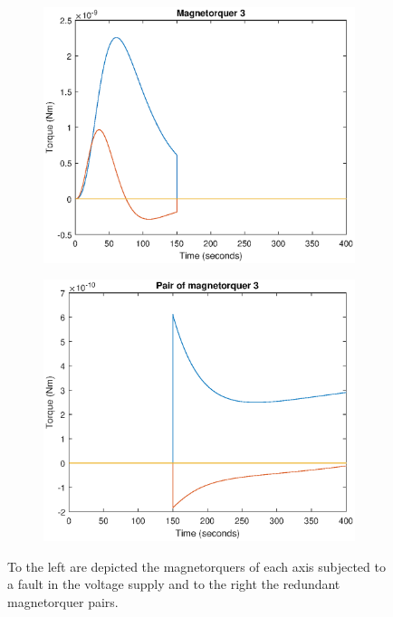 \begin{figure}[H]
\begin{subfigure}{0.5\linewidth}
	\includegraphics[width=1\linewidth]{figures/config3.eps}
	\label{fig:fig:magcompens33}
	\caption{}
\end{subfigure}
\begin{subfigure}{0.5\linewidth}
	\centering
	\includegraphics[width=1\linewidth]{figures/config33.eps}
	\label{fig:fig:magcompens43}	
	\caption{}
\end{subfigure}
	\caption{To the left are depicted the magnetorquers of each axis subjected to a fault in the voltage supply and to the right the redundant magnetorquer pairs.}
	\label{fig:magneticconfig}
	\caption{}
\end{figure}

